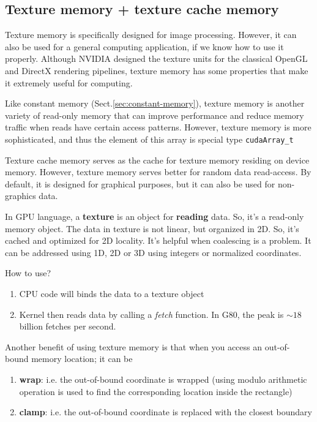 \subsection{Texture memory + texture cache memory}
\label{sec:texture-memory}

Texture memory is specifically designed for image processing. However, it can
also be used for a general computing application, if we know how to use it
properly. Although NVIDIA designed the texture units for the classical OpenGL
and DirectX rendering pipelines, texture memory has some properties that make it
extremely useful for computing.


Like constant memory (Sect.\ref{sec:constant-memory}), texture memory is another
variety of read-only memory that can improve performance and reduce memory
traffic when reads have certain access patterns. However, texture memory is more
sophisticated, and thus the element of this array is special type
\verb!cudaArray_t!

Texture cache memory serves as the cache for texture
memory residing on device memory. However, texture memory serves better for
random data read-access. By default, it is designed for graphical purposes, but
it can also be used for non-graphics data.


In GPU language, a {\bf texture} is an object for {\bf reading}
data. So, it's a read-only memory object. The data in texture is not
linear, but organized in 2D. So, it's cached and optimized for 2D
locality. It's helpful when coalescing is a problem. It can be
addressed using 1D, 2D or 3D using integers or normalized
coordinates. 

How to use?
\begin{enumerate}
\item CPU code will binds the data to a texture object
\item Kernel then reads data by calling a {\it fetch} function. In
  G80, the peak is $\sim 18$billion fetches per second. 
\end{enumerate}

Another benefit of using texture memory is that when you access an
out-of-bound memory location; it can be
\begin{enumerate}
\item {\bf wrap}: i.e. the out-of-bound coordinate is wrapped (using
  modulo arithmetic operation is used to find the corresponding
  location inside the rectangle)
\item {\bf clamp}: i.e. the out-of-bound coordinate is replaced with
  the closest boundary 
\end{enumerate}

